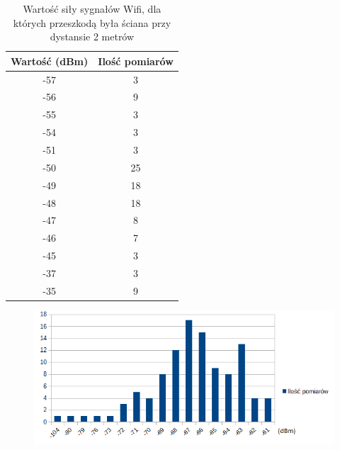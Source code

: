 \begin{table}[H]
	\caption {Wartość siły sygnałów Wifi, dla których przeszkodą była ściana przy dystansie 2 metrów}
\begin{center}
		\begin{tabular}{|c|c|}
			\hline
			Wartość (dBm) & Ilość pomiarów \\ 
			\hline
			-57 & 3\\
			\hline
			-56 & 9\\
			\hline
			-55 & 3\\
			\hline
			-54 & 3\\
			\hline
			-51 & 3\\
			\hline
			-50 & 25\\
			\hline
			-49 & 18\\
			\hline
			-48 & 18\\
			\hline
			-47 & 8\\
			\hline
			-46 & 7\\
			\hline
			-45 & 3\\
			\hline
			-37 & 3\\
			\hline
			-35 & 9\\
			\hline
		\end{tabular}
\end{center}
\end{table}
\begin{figure}[H]			
\centering
\includegraphics[width=1.0\textwidth]{wykres_wifi_4}
\end{figure}
